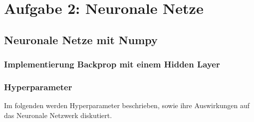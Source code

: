 \pagebreak
\section{Aufgabe 2: Neuronale Netze}
\subsection{Neuronale Netze mit Numpy}
\subsubsection{Implementierung Backprop mit einem Hidden Layer}
\subsubsection{Hyperparameter}
Im folgenden werden Hyperparameter beschrieben, sowie ihre Auswirkungen auf das Neuronale Netzwerk diskutiert.
